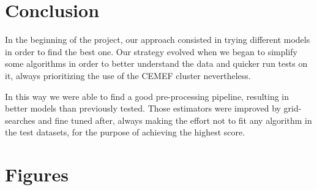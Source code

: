 \documentclass[letterpaper,11pt]{article}
\begin{document}
\section{Conclusion}
In the beginning of the project, our approach consisted in trying different models in order to find the best one. Our strategy evolved when we began to simplify some algorithms in order to better understand the data and quicker run tests on it, always prioritizing the use of the CEMEF cluster nevertheless.

In this way we were able to find a good pre-processing pipeline, resulting in better models than previously tested. Those estimators were improved by grid-searches and fine tuned after, always making the effort not to fit any algorithm in the test datasets, for the purpose of achieving the highest score.

\clearpage
\appendix
\section{Figures}
\end{document}
